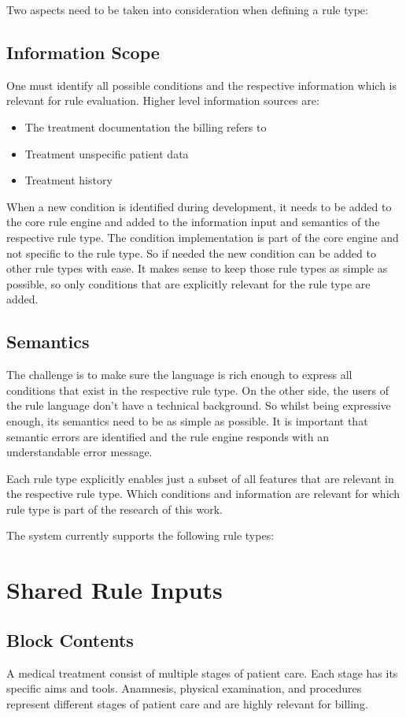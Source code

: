 Two aspects need to be taken into consideration when defining a rule type:

\subsection{Information Scope}
One must identify all possible conditions and the respective information which is relevant for rule evaluation.
Higher level information sources are:
\begin{itemize}
    \item The treatment documentation the billing refers to
    \item Treatment unspecific patient data
    \item Treatment history
\end{itemize}
When a new condition is identified during development, it needs to be added to the core rule engine and added to the information input and semantics of the respective rule type.
The condition implementation is part of the core engine and not specific to the rule type.
So if needed the new condition can be added to other rule types with ease.
It makes sense to keep those rule types as simple as possible, so only conditions that are explicitly relevant for the rule type are added.

\subsection{Semantics}
The challenge is to make sure the language is rich enough to express all conditions that exist in the respective rule type.
On the other side, the users of the rule language don't have a technical background.
So whilst being expressive enough, its semantics need to be as simple as possible.
It is important that semantic errors are identified and the rule engine responds with an understandable error message.

Each rule type explicitly enables just a subset of all features that are relevant in the respective rule type.
Which conditions and information are relevant for which rule type is part of the research of this work.

The system currently supports the following rule types:


\section{Shared Rule Inputs}
\subsection{Block Contents}
A medical treatment consist of multiple stages of patient care.
Each stage has its specific aims and tools.
Anamnesis, physical examination, and procedures represent different stages of patient care and are highly relevant for billing.


